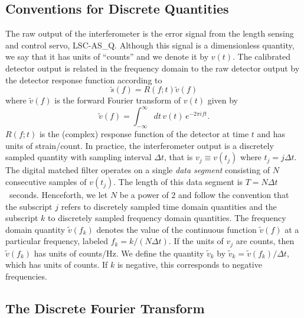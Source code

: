 \subsection{Conventions for Discrete Quantities}
\label{ss:conventions}

The raw output of the interferometer is the error signal from the length
sensing and control servo, LSC-AS\_Q.  Although this signal is a dimensionless
quantity, we say that it has units of ``counts'' and we denote it by $v(t)$.
The calibrated detector output is related in the frequency domain to the raw
detector output by the detector response function according to 
\begin{equation}
\tilde{s}(f) = R(f;t) \tilde{v}(f)
\end{equation}
where $\tilde{v}(f)$ is the forward Fourier transform of $v(t)$ given by
\begin{equation}
\tilde{v}(f)=\int_{-\infty}^\infty dt\,v(t)\, e^{- 2 \pi i f t}.
\end{equation}
$R(f;t)$ is the (complex) response function of the detector at time $t$
and has units of strain/count.  In practice, the interferometer output is a
discretely sampled quantity with sampling interval $\Delta t$, that is $v_j
\equiv v(t_j)$ where $t_j = j\Delta t$.  The digital matched filter operates
on a single \emph{data segment} consisting of $N$ consecutive samples of
$v(t_j)$. The length of this data segment is $T = N\Delta t$~seconds.
Henceforth, we let $N$ be a power of $2$ and follow the convention that the
subscript $j$ refers to discretely sampled time domain quantities and the
subscript $k$ to discretely sampled frequency domain quantities.  The
frequency domain quantity $\tilde{v}(f_k)$ denotes the value of the continuous
function $\tilde{v}(f)$ at a particular frequency, labeled $f_k = k/(N\Delta
t)$. If the units of $v_j$ are counts, then $\tilde{v}(f_k)$ has units of
counts/Hz. We define the quantity $\tilde{v}_k$ by $\tilde{v}_k =
\tilde{v}(f_k) / \Delta t$, which has units of counts. If $k$ is negative,
this corresponds to negative frequencies.

\subsection{The Discrete Fourier Transform}
\label{ss:dft}


